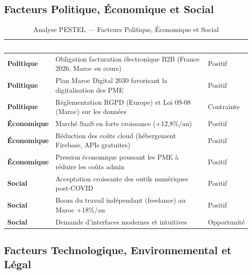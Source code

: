 \documentclass[12pt,a4paper]{report}
\begin{document}
\subsection{Facteurs Politique, Économique et Social}

\begin{table}[H]
\centering
\caption{Analyse PESTEL — Facteurs Politique, Économique et Social}
\label{tab:pestel_pes}
\begin{tabularx}{\textwidth}{|l|X|l|}
\hline
\rowcolor{emsiblue}\textcolor{white}{\textbf{Dimension}} & \textcolor{white}{\textbf{Facteur identifié}} & \textcolor{white}{\textbf{Impact}} \\
\hline
\textbf{Politique} & Obligation facturation électronique B2B (France 2026, Maroc en cours) & Positif \\
\textbf{Politique} & Plan Maroc Digital 2030 favorisant la digitalisation des PME & Positif \\
\textbf{Politique} & Réglementation RGPD (Europe) et Loi 09-08 (Maroc) sur les données & Contrainte \\
\textbf{Économique} & Marché SaaS en forte croissance (+12,8\%/an) & Positif \\
\textbf{Économique} & Réduction des coûts cloud (hébergement Firebase, APIs gratuites) & Positif \\
\textbf{Économique} & Pression économique poussant les PME à réduire les coûts admin & Positif \\
\textbf{Social} & Acceptation croissante des outils numériques post-COVID & Positif \\
\textbf{Social} & Boom du travail indépendant (freelance) au Maroc +18\%/an & Positif \\
\textbf{Social} & Demande d'interfaces modernes et intuitives & Opportunité \\
\hline
\end{tabularx}
\end{table}

\subsection{Facteurs Technologique, Environnemental et Légal}
\end{document}
